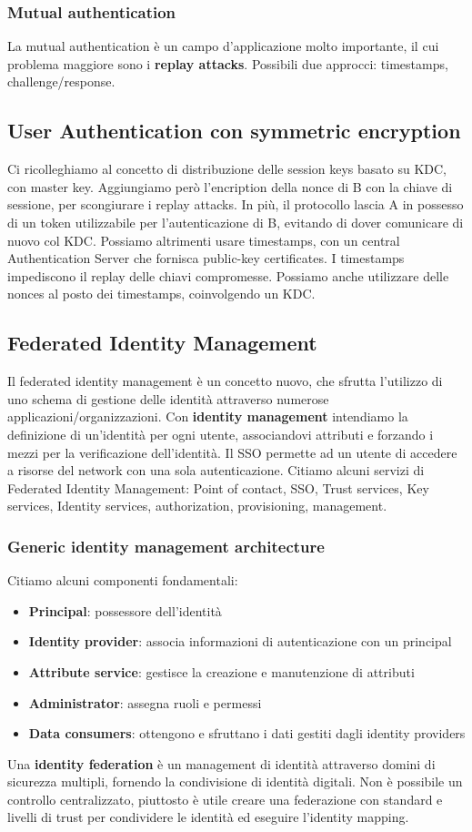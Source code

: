 \documentclass[11pt]{article}
\begin{document}
\subsubsection{Mutual authentication}
La mutual authentication è un campo d'applicazione molto importante, il cui problema maggiore sono i \textbf{replay attacks}. Possibili due approcci: timestamps, challenge/response.
\subsection{User Authentication con symmetric encryption}
Ci ricolleghiamo al concetto di distribuzione delle session keys basato su KDC, con master key. Aggiungiamo però l'encription della nonce di B con la chiave di sessione, per scongiurare i replay attacks. In più, il protocollo lascia A in possesso di un token utilizzabile per l'autenticazione di B, evitando di dover comunicare di nuovo col KDC. Possiamo altrimenti usare timestamps, con un central Authentication Server che fornisca public-key certificates. I timestamps impediscono il replay delle chiavi compromesse. Possiamo anche utilizzare delle nonces al posto dei timestamps, coinvolgendo un KDC. 
\subsection{Federated Identity Management}
Il federated identity management è un concetto nuovo, che sfrutta l'utilizzo di uno schema di gestione delle identità attraverso numerose applicazioni/organizzazioni. Con \textbf{identity management} intendiamo la definizione di un'identità per ogni utente, associandovi attributi e forzando i mezzi per la verificazione dell'identità. Il SSO permette ad un utente di accedere a risorse del network con una sola autenticazione. Citiamo alcuni servizi di Federated Identity Management: Point of contact, SSO, Trust services, Key services, Identity services, authorization, provisioning, management. 
\subsubsection{Generic identity management architecture}
Citiamo alcuni componenti fondamentali:
\begin{itemize}
    \item \textbf{Principal}: possessore dell'identità
    \item \textbf{Identity provider}: associa informazioni di autenticazione con un principal
    \item \textbf{Attribute service}: gestisce la creazione e manutenzione di attributi 
    \item \textbf{Administrator}: assegna ruoli e permessi
    \item \textbf{Data consumers}: ottengono e sfruttano i dati gestiti dagli identity providers
\end{itemize}
Una \textbf{identity federation} è un management di identità attraverso domini di sicurezza multipli, fornendo la condivisione di identità digitali. Non è possibile un controllo centralizzato, piuttosto è utile creare una federazione con standard e livelli di trust per condividere le identità ed eseguire l'identity mapping. 
\end{document}
